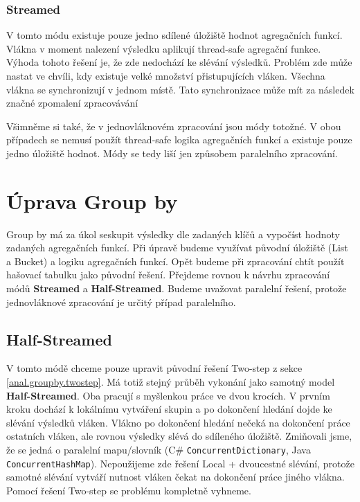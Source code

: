 \subsubsection{Streamed}

V tomto módu existuje pouze jedno sdílené úložiště hodnot agregačních funkcí.
Vlákna v moment nalezení výsledku aplikují thread-safe agregační funkce.
Výhoda tohoto řešení je, že zde nedochází ke slévání výsledků.
Problém zde může nastat ve chvíli, kdy existuje velké množství přistupujících vláken.
Všechna vlákna se synchronizují v jednom místě.
Tato synchronizace může mít za následek značné zpomalení zpracovávání

\smallskip
Všimněme si také, že v jednovláknovém zpracování jsou módy totožné.
V obou případech se nemusí použít thread-safe logika agregačních funkcí a existuje pouze jedno úložiště hodnot.
Módy se tedy liší jen způsobem paralelního zpracování.


\section{Úprava Group by}

Group by má za úkol seskupit výsledky dle zadaných klíčů a vypočíst hodnoty zadaných agregačních funkcí.
Při úpravě budeme využívat původní úložiště (List a Bucket) a logiku agregačních funkcí.
Opět budeme při zpracování chtít použít hašovací tabulku jako původní řešení.
Přejdeme rovnou k návrhu zpracování módů \textbf{Streamed} a \textbf{Half-Streamed}.
Budeme uvažovat paralelní řešení, protože jednovláknové zpracování je určitý případ paralelního.

\subsection{Half-Streamed}

V tomto módě chceme pouze upravit původní řešení Two-step z sekce \ref{anal.groupby.twostep}.
Má totiž stejný průběh vykonání jako samotný model \textbf{Half-Streamed}.
Oba pracují s myšlenkou práce ve dvou krocích.
V prvním kroku dochází k lokálnímu vytváření skupin a po dokončení hledání dojde ke slévání výsledků vláken.
Vlákno po dokončení hledání nečeká na dokončení práce ostatních vláken, ale rovnou výsledky slévá do sdíleného úložiště.
Zmiňovali jsme, že se jedná o paralelní mapu/slovník (C\# \texttt{ConcurrentDictionary}, Java \texttt{ConcurrentHashMap}).
Nepoužijeme zde řešení Local + dvoucestné slévání, protože samotné slévání vytváří nutnost vláken čekat na dokončení práce jiného vlákna.
Pomocí řešení Two-step se problému kompletně vyhneme.

